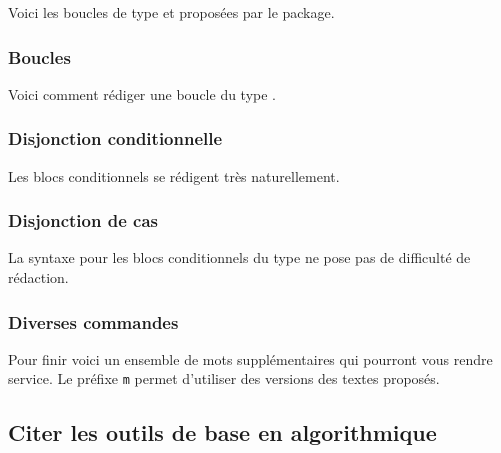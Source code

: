 \documentclass[12pt,a4paper]{article}
\begin{document}
Voici les boucles de type \TTfor{} et \TTwhile{} proposées par le package.



\subsubsection{Boucles \TTrepeat{}}

Voici comment rédiger une boucle du type \TTrepeat{}.



\subsubsection{Disjonction conditionnelle \TTif{}}

Les blocs conditionnels \TTif{} se rédigent très naturellement.



\subsubsection{Disjonction de cas \TTswitch{}}

La syntaxe pour les blocs conditionnels du type \TTswitch{} ne pose pas de difficulté de rédaction.



\subsubsection{Diverses commandes}

Pour finir voici un ensemble de mots supplémentaires qui pourront vous rendre service. Le préfixe \verb+m+ permet d'utiliser des versions  des textes proposés.







\subsection{Citer les outils de base en algorithmique}
\end{document}
